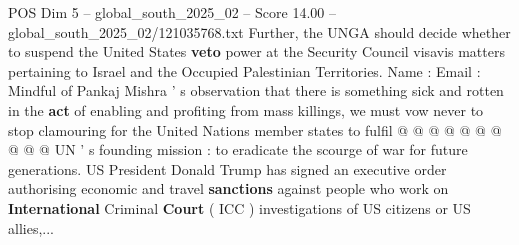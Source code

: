 \begin{textsample}{POS Dim 5 – global\_south\_2025\_02 – Score 14.00 – global\_south\_2025\_02/121035768.txt}
Further, the UNGA should decide whether to suspend the United States \textbf{veto} power at the Security Council visavis matters pertaining to Israel and the Occupied Palestinian Territories.
Name : Email : Mindful of Pankaj Mishra ' s observation that there is something sick and rotten in the \textbf{act} of enabling and profiting from mass killings, we must vow never to stop clamouring for the United Nations member states to fulfil @ @ @ @ @ @ @ @ @ @ UN ' s founding mission : to eradicate the scourge of war for future generations.
US President Donald Trump has signed an executive order authorising economic and travel \textbf{sanctions} against people who work on \textbf{International} Criminal \textbf{Court} ( ICC ) investigations of US citizens or US allies,...

\end{textsample}
